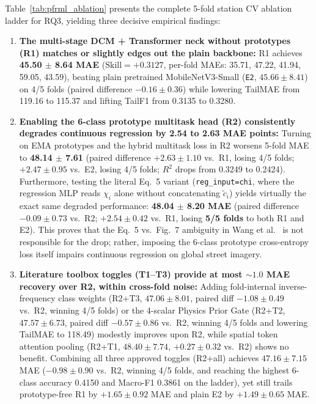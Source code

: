 \documentclass[conference]{IEEEtran}
\begin{document}
Table~\ref{tab:pfrml_ablation} presents the complete 5-fold station CV ablation
ladder for RQ3, yielding three decisive empirical findings:
\begin{enumerate}
  \item \textbf{The multi-stage DCM + Transformer neck without prototypes (R1)
        matches or slightly edges out the plain backbone:} R1 achieves
        \textbf{45.50 $\pm$ 8.64 MAE} ($\text{Skill} = +0.3127$, per-fold MAEs:
        35.71, 47.22, 41.94, 59.05, 43.59), beating plain pretrained
        MobileNetV3-Small (\texttt{E2}, $45.66 \pm 8.41$) on 4/5 folds (paired
        difference $-0.16 \pm 0.36$) while lowering TailMAE from 119.16 to
        115.37 and lifting TailF1 from 0.3135 to 0.3280.
  \item \textbf{Enabling the 6-class prototype multitask head (R2) consistently
        degrades continuous regression by 2.54 to 2.63 MAE points:} Turning on
        EMA prototypes and the hybrid multitask loss in R2 worsens 5-fold MAE to
        \textbf{48.14 $\pm$ 7.61} (paired difference $+2.63 \pm 1.10$ vs.\ R1,
        losing 4/5 folds; $+2.47 \pm 0.95$ vs.\ E2, losing 4/5 folds; $R^2$
        drops from 0.3249 to 0.2424). Furthermore, testing the literal Eq.~5
        variant (\texttt{reg\_input=chi}, where the regression MLP reads
        $\chi_i$ alone without concatenating $\tilde{c}_i$) yields virtually the
        exact same degraded performance: \textbf{48.04 $\pm$ 8.20 MAE} (paired
        difference $-0.09 \pm 0.73$ vs.\ R2; $+2.54 \pm 0.42$ vs.\ R1, losing
        \textbf{5/5 folds} to both R1 and E2). This proves that the Eq.~5
        vs.\ Fig.~7 ambiguity in Wang et
        al.~\cite{wangPrototypeFeatureRepresentationGuided2026} is not
        responsible for the drop; rather, imposing the 6-class prototype
        cross-entropy loss itself impairs continuous regression on global street
        imagery.
  \item \textbf{Literature toolbox toggles (T1--T3) provide at most $\sim 1.0$
        MAE recovery over R2, within cross-fold noise:} Adding fold-internal
        inverse-frequency class weights (R2+T3, $47.06 \pm 8.01$, paired diff
        $-1.08 \pm 0.49$ vs.\ R2, winning 4/5 folds) or the 4-scalar Physics
        Prior Gate (R2+T2, $47.57 \pm 6.73$, paired diff $-0.57 \pm 0.86$
        vs.\ R2, winning 4/5 folds and lowering TailMAE to 118.49) modestly
        improves upon R2, while spatial token attention pooling (R2+T1,
        $48.40 \pm 7.74$, $+0.27 \pm 0.32$ vs.\ R2) shows no benefit. Combining
        all three approved toggles (R2+all) achieves $47.16 \pm 7.15$ MAE
        ($-0.98 \pm 0.90$ vs.\ R2, winning 4/5 folds, and reaching the highest
        6-class accuracy 0.4150 and Macro-F1 0.3861 on the ladder), yet still
        trails prototype-free R1 by $+1.65 \pm 0.92$ MAE and plain E2 by
        $+1.49 \pm 0.65$ MAE.
\end{enumerate}
\end{document}

